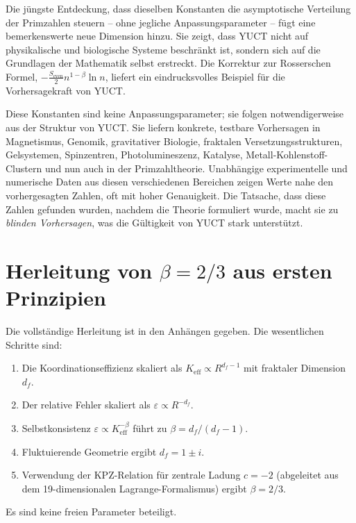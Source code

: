 \documentclass[12pt,a4paper]{article}
\begin{document}
	Die jüngste Entdeckung, dass dieselben Konstanten die asymptotische Verteilung der Primzahlen steuern -- ohne jegliche Anpassungsparameter -- fügt eine bemerkenswerte neue Dimension hinzu. Sie zeigt, dass YUCT nicht auf physikalische und biologische Systeme beschränkt ist, sondern sich auf die Grundlagen der Mathematik selbst erstreckt. Die Korrektur zur Rosserschen Formel, \(-\frac{S_{\text{even}}}{2}n^{1-\beta}\ln n\), liefert ein eindrucksvolles Beispiel für die Vorhersagekraft von YUCT.
	
	Diese Konstanten sind keine Anpassungsparameter; sie folgen notwendigerweise aus der Struktur von YUCT. Sie liefern konkrete, testbare Vorhersagen in Magnetismus, Genomik, gravitativer Biologie, fraktalen Versetzungsstrukturen, Gelsystemen, Spinzentren, Photolumineszenz, Katalyse, Metall-Kohlenstoff-Clustern und nun auch in der Primzahltheorie. Unabhängige experimentelle und numerische Daten aus diesen verschiedenen Bereichen zeigen Werte nahe den vorhergesagten Zahlen, oft mit hoher Genauigkeit. Die Tatsache, dass diese Zahlen gefunden wurden, nachdem die Theorie formuliert wurde, macht sie zu \emph{blinden Vorhersagen}, was die Gültigkeit von YUCT stark unterstützt.
	
	\appendix
	\section{Herleitung von \(\beta = 2/3\) aus ersten Prinzipien}
	\label{app:beta_derivation}
	Die vollständige Herleitung ist in den Anhängen \cite{AppendixL, AppendixY} gegeben. Die wesentlichen Schritte sind:
	\begin{enumerate}
		\item Die Koordinationseffizienz skaliert als \(K_{\mathrm{eff}} \propto R^{d_f-1}\) mit fraktaler Dimension \(d_f\).
		\item Der relative Fehler skaliert als \(\varepsilon \propto R^{-d_f}\).
		\item Selbstkonsistenz \(\varepsilon \propto K_{\mathrm{eff}}^{-\beta}\) führt zu \(\beta = d_f/(d_f-1)\).
		\item Fluktuierende Geometrie ergibt \(d_f = 1 \pm i\).
		\item Verwendung der KPZ-Relation für zentrale Ladung \(c = -2\) (abgeleitet aus dem 19-dimensionalen Lagrange-Formalismus) ergibt \(\beta = 2/3\).
	\end{enumerate}
	Es sind keine freien Parameter beteiligt.
	
\end{document}
